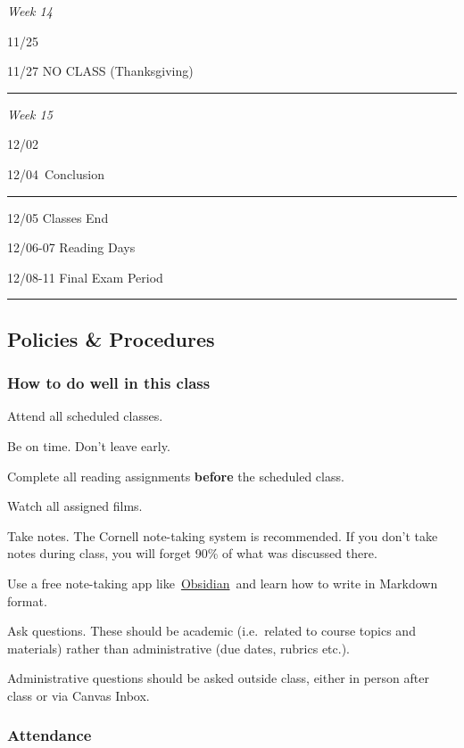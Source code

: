 \documentclass[
  letterpaper,
  DIV=11,
  numbers=noendperiod,
  oneside]{scrartcl}
\begin{document}
\emph{Week 14}

11/25

11/27 NO CLASS (Thanksgiving)

\begin{center}\rule{0.5\linewidth}{0.5pt}\end{center}

\emph{Week 15}

12/02~

12/04~Conclusion

\begin{center}\rule{0.5\linewidth}{0.5pt}\end{center}

12/05 Classes End

12/06-07 Reading Days

12/08-11 Final Exam Period

\begin{center}\rule{0.5\linewidth}{0.5pt}\end{center}

\subsection{Policies \& Procedures}\label{policies-procedures}

\subsubsection{How to do well in this
class}\label{how-to-do-well-in-this-class}

Attend all scheduled classes.

Be on time. Don't leave early.

Complete all reading assignments \textbf{before} the scheduled class.

Watch all assigned films.

Take notes. The Cornell note-taking system is recommended. If you don't
take notes during class, you will forget 90\% of what was discussed
there.~

Use a free note-taking app
like~\href{https://obsidian.md/}{Obsidian}~and learn how to write in
Markdown format.~

Ask questions. These should be academic (i.e.~related to course topics
and materials) rather than administrative (due dates, rubrics etc.).

Administrative questions should be asked outside class, either in person
after class or via Canvas Inbox.

\subsubsection{Attendance}\label{attendance}
\end{document}
